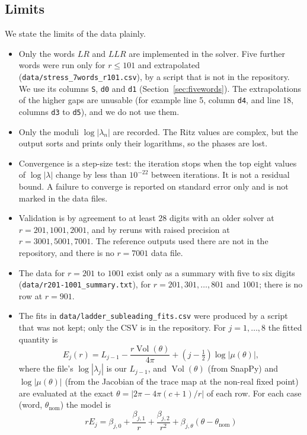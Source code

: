 \documentclass[11pt]{amsart}
\theoremstyle{definition}
\theoremstyle{remark}
\newcommand{\Vol}{\operatorname{Vol}}
\begin{document}
\subsection*{Limits}
We state the limits of the data plainly.
\begin{itemize}
\item Only the words $LR$ and $LLR$ are implemented in the solver. Five further words
were run only for $r \le 101$ and extrapolated (\texttt{data/stress\_7words\_r101.csv}),
by a script that is not in the repository. We use its columns \texttt{S},
\texttt{d0} and \texttt{d1} (Section~\ref{sec:fivewords}). The extrapolations of the
higher gaps are unusable (for example line 5, column \texttt{d4}, and line 18,
columns \texttt{d3} to \texttt{d5}), and we do not use them.
\item Only the moduli $\log|\lambda_n|$ are recorded. The Ritz values are complex,
but the output sorts and prints only their logarithms, so the phases are lost.
\item Convergence is a step-size test: the iteration stops when the top eight values
of $\log|\lambda|$ change by less than $10^{-22}$ between iterations. It is not a
residual bound. A failure to converge is reported on standard error only and is not
marked in the data files.
\item Validation is by agreement to at least $28$ digits with an older solver at
$r = 201, 1001, 2001$, and by reruns with raised precision at $r = 3001, 5001, 7001$.
The reference outputs used there are not in the repository, and there is no
$r = 7001$ data file.
\item The data for $r = 201$ to $1001$ exist only as a summary with five to six
digits (\texttt{data/r201-1001\_summary.txt}), for $r = 201, 301, \dots, 801$ and
$1001$; there is no row at $r = 901$.
\item The fits in \texttt{data/ladder\_subleading\_fits.csv} were produced by a
script that was not kept; only the CSV is in the repository. For $j = 1, \dots, 8$
the fitted quantity is
\[
E_j(r) = L_{j-1} - \frac{r\Vol(\theta)}{4\pi} + \left(j - \tfrac12\right)\log|\mu(\theta)|,
\]
where the file's $\log|\lambda_j|$ is our $L_{j-1}$, and $\Vol(\theta)$ (from SnapPy)
and $\log|\mu(\theta)|$ (from the Jacobian of the trace map at the non-real fixed
point) are evaluated at the exact $\theta = |2\pi - 4\pi(c+1)/r|$ of each row. For each
case (word, $\theta_{\mathrm{nom}}$) the model is
\[
rE_j = \beta_{j,0} + \frac{\beta_{j,1}}{r} + \frac{\beta_{j,2}}{r^2}
+ \beta_{j,\theta}(\theta - \theta_{\mathrm{nom}})
\]
\end{itemize}
\end{document}
